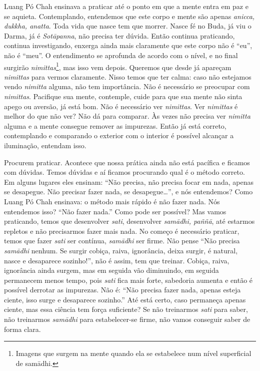 Luang Pó Chah ensinava a praticar até o ponto em que a mente entra
em paz e se aquieta. Contemplando, entendemos que este corpo e mente
são apenas \textit{anicca, dukkha, anatta}. Toda vida que nasce tem que
morrer. Nasce fé no Buda, já viu o Darma, já é \textit{Sot\=apanna},
não precisa ter dúvida. Então continua praticando, continua
investigando, enxerga ainda mais claramente que este corpo não é “eu”,
não é “meu”. O entendimento se aprofunda de acordo com o nível, e no
final surgirão \textit{nimittas}\footnote{Imagens que surgem na mente
quando ela se estabelece num nível superficial de sam\=adhi.}, mas isso
vem depois. Queremos que desde já apareçam \textit{nimittas} para
vermos claramente. Nisso temos que ter calma: caso não estejamos vendo
\textit{nimitta} alguma, não tem importância. Não é necessário se
preocupar com \textit{nimittas}. Pacifique sua mente, contemple, cuide
para que sua mente não sinta apego ou aversão, já está bom. Não é
necessário ver \textit{nimittas}. Ver \textit{nimittas} é melhor do que
não ver? Não dá para comparar. Às vezes não precisa ver
\textit{nimitta} alguma e a mente consegue remover as impurezas. Então
já está correto, contemplando e comparando o exterior com o interior é
possível alcançar a iluminação, entendam isso. 

Procurem praticar. Acontece que nossa prática ainda não está
pacífica e ficamos com dúvidas. Temos dúvidas e aí ficamos procurando
qual é o método correto. Em alguns lugares eles ensinam: “Não precisa,
não precisa focar em nada, apenas se desapegue. Não precisar fazer
nada, se desapegue…”, e nós entendemos? Como Luang Pó Chah ensinava: o
método mais rápido é não fazer nada. Nós entendemos isso? “Não fazer
nada.” Como pode ser possível? Mas vamos praticando, temos que
desenvolver \textit{sati}, desenvolver \textit{sam\=adhi, paññ\=a}, até
estarmos repletos e não precisarmos fazer mais nada. No começo é
necessário praticar, temos que fazer \textit{sati} ser contínua,
\textit{sam\=adhi} ser firme. Não pense “Não precisa \textit{sam\=adhi}
nenhum. Se surgir cobiça, raiva, ignorância, deixa surgir, é natural,
nasce e desaparece sozinho!”, não é assim, tem que treinar. Cobiça,
raiva, ignorância ainda surgem, mas em seguida vão diminuindo, em
seguida permanecem menos tempo, pois \textit{sati} fica mais forte,
sabedoria aumenta e então é possível derrotar as impurezas. Não é: “Não
precisa fazer nada, apenas esteja ciente, isso surge e desaparece
sozinho.” Até está certo, caso permaneça apenas ciente, mas essa
ciência tem força suficiente? Se não treinarmos \textit{sati} para
saber, não treinarmos \textit{sam\=adhi} para estabelecer-se firme, não
vamos conseguir saber de forma clara. 

